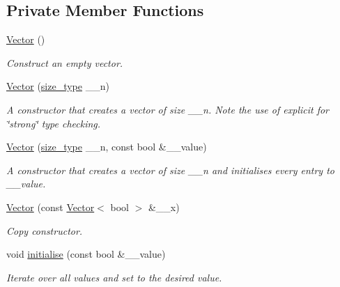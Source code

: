 \subsection*{Private Member Functions}
\begin{DoxyCompactItemize}
\item 
\hyperlink{classoomph_1_1Vector_3_01bool_01_4_a97b8a9d1eebc8ea041b3ec5561c4ec59}{Vector} ()
\begin{DoxyCompactList}\small\item\em Construct an empty vector. \end{DoxyCompactList}\item 
\hyperlink{classoomph_1_1Vector_3_01bool_01_4_ac7f720fa5a5c33441d5d6f483de27a7c}{Vector} (\hyperlink{classoomph_1_1Vector_3_01bool_01_4_a016848fc2d6e301e64a0209ade793732}{size\+\_\+type} \+\_\+\+\_\+n)
\begin{DoxyCompactList}\small\item\em A constructor that creates a vector of size \+\_\+\+\_\+n. Note the use of explicit for \char`\"{}strong\char`\"{} type checking. \end{DoxyCompactList}\item 
\hyperlink{classoomph_1_1Vector_3_01bool_01_4_a9be6c35ffa4cd81c0f046be9b5adc87d}{Vector} (\hyperlink{classoomph_1_1Vector_3_01bool_01_4_a016848fc2d6e301e64a0209ade793732}{size\+\_\+type} \+\_\+\+\_\+n, const bool \&\+\_\+\+\_\+value)
\begin{DoxyCompactList}\small\item\em A constructor that creates a vector of size \+\_\+\+\_\+n and initialises every entry to \+\_\+\+\_\+value. \end{DoxyCompactList}\item 
\hyperlink{classoomph_1_1Vector_3_01bool_01_4_acd294c9e1af5c2a61af05d55f03c1800}{Vector} (const \hyperlink{classoomph_1_1Vector}{Vector}$<$ bool $>$ \&\+\_\+\+\_\+x)
\begin{DoxyCompactList}\small\item\em Copy constructor. \end{DoxyCompactList}\item 
void \hyperlink{classoomph_1_1Vector_3_01bool_01_4_a8b7fa962119d12a28ae56ff10ebfe301}{initialise} (const bool \&\+\_\+\+\_\+value)
\begin{DoxyCompactList}\small\item\em Iterate over all values and set to the desired value. \end{DoxyCompactList}\end{DoxyCompactItemize}


